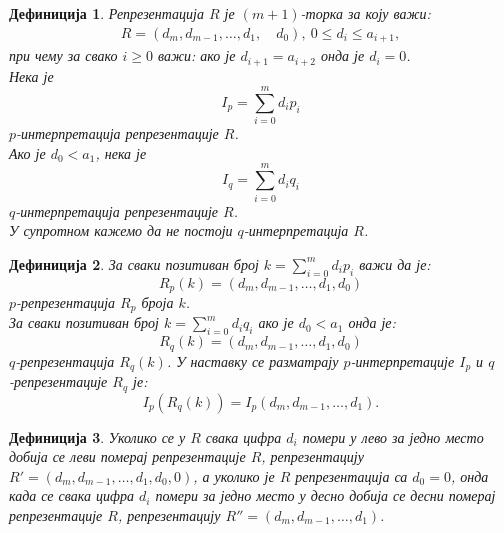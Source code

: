 \documentclass[a4paper]{article}
\newtheorem{definition}{Дефиниција}
\begin{document}
\begin{definition}
	Репрезентација $ R $ је  $ (m+1) $-торка за коју важи:
		\begin{eqnarray}
			R = (d_{m}, d_{m-1}, \ldots , d_{1},\quad d_{0}),\ 0 \le d_{i} \le a_{i+1},
		\end{eqnarray}
	при чему за свако $ i \ge 0 $ важи: ако је $ d_{i+1} = a_{i+2} $ онда је $ d_{i} = 0 $.\\
	Нека је 
		\begin{displaymath}
			I_{p} = \sum_{i=0}^{m} d_{i}p_{i}
		\end{displaymath} 		
	$ p $-интерпретација репрезентације $ R $.\\ 
	Ако је $ d_{0} < a_{1} $, нека је 
		\begin{displaymath}
			I_{q} = \sum_{i=0}^{m} d_{i}q_{i}
		\end{displaymath}  
	$ q $-интерпретација репрезентације $ R $.\\ 
	У супротном кажемо да не постоји $ q $-интерпретација $ R $.
\end{definition}

\begin{definition}
	За сваки позитиван број $ k = \sum_{i=0}^{m} d_{i}p_{i} $ важи да је: 	
		\begin{displaymath}
			R_{p}(k) = (d_{m}, d_{m-1}, \ldots , d_{1}, d_{0})
		\end{displaymath}	
	$ p $-репрезентација $ R_{p} $ броја $ k $.\\
	За сваки позитиван број $ k = \sum_{i=0}^{m} d_{i}q_{i} $ ако је $ d_{0} < a_{1} $ онда је:	
		\begin{displaymath}
			R_{q}(k) = (d_{m}, d_{m-1}, \ldots , d_{1}, d_{0})
		\end{displaymath}	
	 $ q $-репрезентација $ R_{q}(k) $. 
	У наставку се разматрају $ p $-интерпретације $ I_{p} $ и $ q $-репрезентације $ R_{q} $ је:
	\begin{displaymath}
		I_{p}(R_{q}(k)) = I_{p}(d_{m}, d_{m-1}, \ldots, d_{1}).
	\end{displaymath}
\end{definition}

\begin{definition}
	Уколико се у $ R $ свака цифра $ d_{i} $ помери у лево за једно место добија се  леви померај репрезентације $ R $, репрезентацију $ R' = (d_{m}, d_{m-1}, \ldots , d_{1}, d_{0}, 0) $, а уколико је $ R $ репрезентација  са $ d_{0} = 0 $, онда када се свака цифра $ d_{i} $ помери за једно место у десно добија се десни померај репрезентације $ R $, репрезентацију $ R'' = (d_{m}, d_{m-1}, \ldots , d_{1}) $. 
\end{definition}
\end{document}
